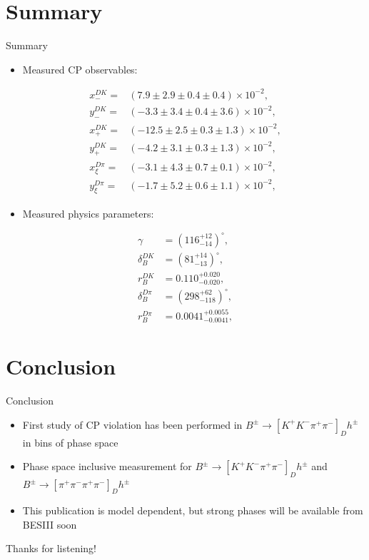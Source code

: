 \documentclass{beamer}
\begin{document}
\section{Summary}

\begin{frame}{Summary}
  \begin{itemize}
    \item{Measured CP observables:}
  \end{itemize}
  \vspace{-0.2cm}
  \begin{align*}
    x_-^{DK} =& (7.9 \pm 2.9 \pm 0.4 \pm 0.4)\times 10^{-2}, \\
    y_-^{DK} =& (-3.3 \pm 3.4 \pm 0.4 \pm 3.6)\times 10^{-2}, \\
    x_+^{DK} =& (-12.5 \pm 2.5 \pm 0.3 \pm 1.3)\times 10^{-2}, \\
    y_+^{DK} =& (-4.2 \pm 3.1 \pm 0.3 \pm 1.3)\times 10^{-2}, \\
    x_\xi^{D\pi} =& (-3.1 \pm 4.3 \pm 0.7 \pm 0.1)\times 10^{-2}, \\
    y_\xi^{D\pi} =& (-1.7 \pm 5.2 \pm 0.6 \pm 1.1)\times 10^{-2},
  \end{align*}
  \vspace{-0.5cm}
  \begin{itemize}
    \item{Measured physics parameters:}
  \end{itemize}
  \vspace{-0.2cm}
  \begin{align*}
    \gamma &= (116^{+12}_{-14})^\circ, \\
    \delta_B^{DK} &= (81^{+14}_{-13})^\circ, \\
    r_B^{DK} &= 0.110^{+0.020}_{-0.020}, \\
    \delta_B^{D\pi} &= (298^{+62}_{-118})^\circ, \\
    r_B^{D\pi} &= 0.0041^{+0.0055}_{-0.0041},
  \end{align*}
\end{frame}

\section{Conclusion}

\begin{frame}{Conclusion}
  \begin{itemize}
    \setlength\itemsep{2.5em}
    \item{First study of CP violation has been performed in $B^\pm\to[K^+K^-\pi^+\pi^-]_D h^\pm$ in bins of phase space}
    \item{Phase space inclusive measurement for $B^\pm\to[K^+K^-\pi^+\pi^-]_D h^\pm$ and $B^\pm\to[\pi^+\pi^-\pi^+\pi^-]_D h^\pm$}
    \item{This publication is model dependent, but strong phases will be available from BESIII soon}
  \end{itemize}
  \begin{center}
    \huge Thanks for listening!
  \end{center}
\end{frame}
\end{document}
